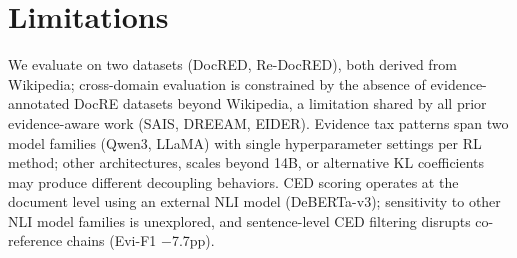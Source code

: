 \section{Limitations}

We evaluate on two datasets (DocRED, Re-DocRED), both derived from Wikipedia; cross-domain evaluation is constrained by the absence of evidence-annotated DocRE datasets beyond Wikipedia, a limitation shared by all prior evidence-aware work (SAIS, DREEAM, EIDER).
Evidence tax patterns span two model families (Qwen3, LLaMA) with single hyperparameter settings per RL method; other architectures, scales beyond 14B, or alternative KL coefficients may produce different decoupling behaviors.
CED scoring operates at the document level using an external NLI model (DeBERTa-v3); sensitivity to other NLI model families is unexplored, and sentence-level CED filtering disrupts co-reference chains (Evi-F1 $-$7.7pp).
